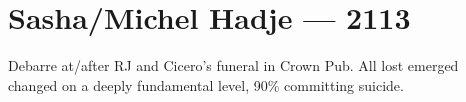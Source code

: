 \chapter*{Sasha/Michel Hadje — 2113}

Debarre at/after RJ and Cicero's funeral in Crown Pub. All lost emerged changed on a deeply fundamental level, 90\% committing suicide.
